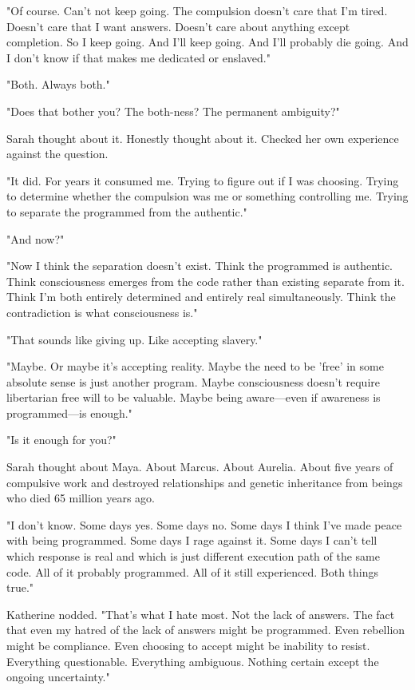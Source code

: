 "Of course. Can't not keep going. The compulsion doesn't care that I'm tired. Doesn't care that I want answers. Doesn't care about anything except completion. So I keep going. And I'll keep going. And I'll probably die going. And I don't know if that makes me dedicated or enslaved."

"Both. Always both."

"Does that bother you? The both-ness? The permanent ambiguity?"

Sarah thought about it. Honestly thought about it. Checked her own experience against the question.

"It did. For years it consumed me. Trying to figure out if I was choosing. Trying to determine whether the compulsion was me or something controlling me. Trying to separate the programmed from the authentic."

"And now?"

"Now I think the separation doesn't exist. Think the programmed is authentic. Think consciousness emerges from the code rather than existing separate from it. Think I'm both entirely determined and entirely real simultaneously. Think the contradiction is what consciousness is."

"That sounds like giving up. Like accepting slavery."

"Maybe. Or maybe it's accepting reality. Maybe the need to be 'free' in some absolute sense is just another program. Maybe consciousness doesn't require libertarian free will to be valuable. Maybe being aware—even if awareness is programmed—is enough."

"Is it enough for you?"

Sarah thought about Maya. About Marcus. About Aurelia. About five years of compulsive work and destroyed relationships and genetic inheritance from beings who died 65 million years ago.

"I don't know. Some days yes. Some days no. Some days I think I've made peace with being programmed. Some days I rage against it. Some days I can't tell which response is real and which is just different execution path of the same code. All of it probably programmed. All of it still experienced. Both things true."

Katherine nodded. "That's what I hate most. Not the lack of answers. The fact that even my hatred of the lack of answers might be programmed. Even rebellion might be compliance. Even choosing to accept might be inability to resist. Everything questionable. Everything ambiguous. Nothing certain except the ongoing uncertainty."

